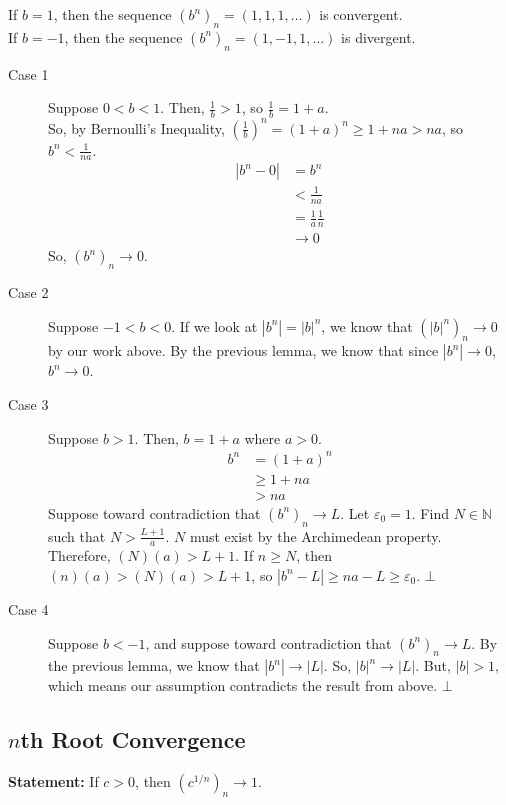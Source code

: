 \documentclass[10pt]{extarticle}
\newcommand{\N}{\mathbb{N}}
\begin{document}
    If $b = 1$, then the sequence $(b^n)_n = (1,1,1,\dots)$ is convergent.\\

    If $b = -1$, then the sequence $(b^n)_n = (1,-1,1,\dots)$ is divergent.
    \begin{description}
      \item[Case 1] Suppose $0 < b < 1$. Then, $\frac{1}{b}> 1$, so $\frac{1}{b} = 1+a$.\\

        So, by Bernoulli's Inequality, $\left(\frac{1}{b}\right)^n = \left(1+a\right)^n \geq 1 + na > na$, so $b^n < \frac{1}{na}$.
        \begin{align*}
          |b^n-0| &= b^n\\
                  &< \frac{1}{na}\\
                  &= \frac{1}{a}\frac{1}{n}\\
                  &\rightarrow 0
        \end{align*}
        So, $\left(b^n\right)_n \rightarrow 0$.
      \item[Case 2] Suppose $-1 < b < 0$. If we look at $|b^n| = |b|^n$, we know that $\left(|b|^n\right)_n \rightarrow 0$ by our work above. By the previous lemma, we know that since $|b^n|\rightarrow 0$, $b^n \rightarrow 0$.
      \item[Case 3] Suppose $b > 1$. Then, $b = 1 + a$ where $a > 0$.
        \begin{align*}
          b^n &= (1+a)^n\\
              &\geq 1 + na \tag*{Bernoulli's Inequality}\\
              &> na
        \end{align*}
        Suppose toward contradiction that $\left(b^n\right)_n \rightarrow L$. Let $\varepsilon_0 = 1$. Find $N\in \N$ such that $N > \frac{L + 1}{a}$. $N$ must exist by the Archimedean property.\\

        Therefore, $(N)(a) > L+1$. If $n\geq N$, then $(n)(a) > (N)(a) > L+1$, so $|b^n - L| \geq na - L \geq \varepsilon_0$. $\bot$
      \item[Case 4] Suppose $b < -1$, and suppose toward contradiction that $(b^n)_n \rightarrow L$. By the previous lemma, we know that $|b^n| \rightarrow |L|$. So, $|b|^n \rightarrow |L|$. But, $|b| > 1$, which means our assumption contradicts the result from above. $\bot$
    \end{description}
  \subsection{$n$th Root Convergence}%
  \textbf{Statement:} If $c > 0$, then $\left(c^{1/n}\right)_n \rightarrow 1$.
    
\end{document}
